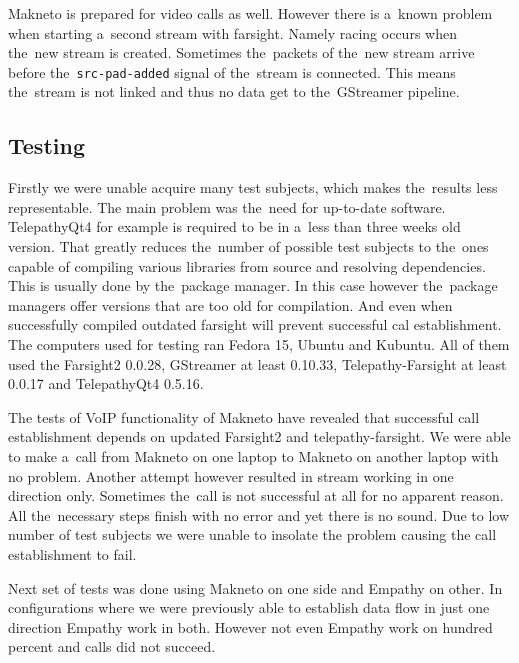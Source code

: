 Makneto is prepared for video calls as well. However there is a~known problem when starting a~second stream with farsight. Namely racing occurs when the~new stream is created. Sometimes the~packets of the~new stream arrive before the~\verb|src-pad-added| signal of the~stream is connected. This means the~stream is not linked and thus no data get to the~GStreamer pipeline. 

\subsection*{Testing}
Firstly we were unable acquire many test subjects, which makes the~results less representable. The main problem was the~need for up-to-date software. TelepathyQt4 for example is required to be in a~less than three weeks old version. That greatly reduces the~number of possible test subjects to the~ones capable of compiling various libraries from source and resolving dependencies. This is usually done by the~package manager. In this case however the~package managers offer versions that are too old for compilation. And even when successfully compiled outdated farsight will prevent successful cal establishment. The computers used for testing ran Fedora 15, Ubuntu and Kubuntu. All of them used the Farsight2 0.0.28, GStreamer at least 0.10.33, Telepathy-Farsight at least 0.0.17 and TelepathyQt4 0.5.16.

The tests of VoIP functionality of Makneto have revealed that successful call establishment depends on updated Farsight2 and telepathy-farsight. We were able to make a~call from Makneto on one laptop to Makneto on another laptop with no problem. Another attempt however resulted in stream working in one direction only. Sometimes the~call is not successful at all for no apparent reason. All the~necessary steps finish with no error and yet there is no sound. Due to low number of test subjects we were unable to insolate the problem causing the call establishment to fail.

Next set of tests was done using Makneto on one side and Empathy on other. In configurations where we were previously able to establish data flow in just one direction Empathy work in both. However not even Empathy work on hundred percent and calls did not succeed. 



